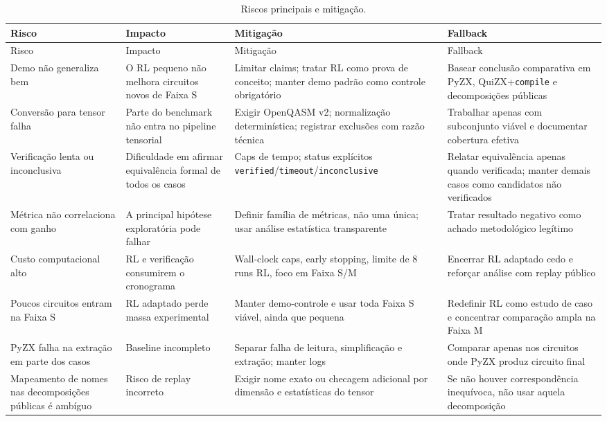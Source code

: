 \documentclass[a4paper,11pt]{article}
\begin{document}
\begin{longtable}{p{} p{} p{} p{}}
\caption{Riscos principais e mitigação.}
\label{tab:risks}\\
\toprule
Risco & Impacto & Mitigação & Fallback \\
\midrule
\endfirsthead
\toprule
Risco & Impacto & Mitigação & Fallback \\
\midrule
\endhead
Demo não generaliza bem & O RL pequeno não melhora circuitos novos de Faixa S & Limitar claims; tratar RL como prova de conceito; manter demo padrão como controle obrigatório & Basear conclusão comparativa em PyZX, QuiZX+\texttt{compile} e decomposições públicas \\
Conversão para tensor falha & Parte do benchmark não entra no pipeline tensorial & Exigir OpenQASM v2; normalização determinística; registrar exclusões com razão técnica & Trabalhar apenas com subconjunto viável e documentar cobertura efetiva \\
Verificação lenta ou inconclusiva & Dificuldade em afirmar equivalência formal de todos os casos & Caps de tempo; status explícitos \texttt{verified}/\texttt{timeout}/\texttt{inconclusive} & Relatar equivalência apenas quando verificada; manter demais casos como candidatos não verificados \\
Métrica não correlaciona com ganho & A principal hipótese exploratória pode falhar & Definir família de métricas, não uma única; usar análise estatística transparente & Tratar resultado negativo como achado metodológico legítimo \\
Custo computacional alto & RL e verificação consumirem o cronograma & Wall-clock caps, early stopping, limite de 8 runs RL, foco em Faixa S/M & Encerrar RL adaptado cedo e reforçar análise com replay público \\
Poucos circuitos entram na Faixa S & RL adaptado perde massa experimental & Manter demo-controle e usar toda Faixa S viável, ainda que pequena & Redefinir RL como estudo de caso e concentrar comparação ampla na Faixa M \\
PyZX falha na extração em parte dos casos & Baseline incompleto & Separar falha de leitura, simplificação e extração; manter logs & Comparar apenas nos circuitos onde PyZX produz circuito final \\
Mapeamento de nomes nas decomposições públicas é ambíguo & Risco de replay incorreto & Exigir nome exato ou checagem adicional por dimensão e estatísticas do tensor & Se não houver correspondência inequívoca, não usar aquela decomposição \\
\bottomrule
\end{longtable}
\end{document}
